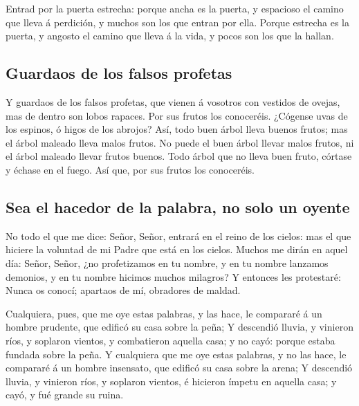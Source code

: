  Entrad por la puerta estrecha: porque ancha es la puerta,
y espacioso el camino que lleva á perdición, y muchos son los que entran
por ella.  Porque estrecha es la puerta, y angosto el
camino que lleva á la vida, y pocos son los que la hallan.

\hypertarget{guardaos-de-los-falsos-profetas}{%
\subsection{Guardaos de los falsos
profetas}\label{guardaos-de-los-falsos-profetas}}

 Y guardaos de los falsos profetas, que vienen á vosotros
con vestidos de ovejas, mas de dentro son lobos rapaces. 
Por sus frutos los conoceréis. ¿Cógense uvas de los espinos, ó higos de
los abrojos?  Así, todo buen árbol lleva buenos frutos; mas
el árbol maleado lleva malos frutos.  No puede el buen
árbol llevar malos frutos, ni el árbol maleado llevar frutos buenos.
 Todo árbol que no lleva buen fruto, córtase y échase en el
fuego.  Así que, por sus frutos los conoceréis.

\hypertarget{sea-el-hacedor-de-la-palabra-no-solo-un-oyente}{%
\subsection{Sea el hacedor de la palabra, no solo un
oyente}\label{sea-el-hacedor-de-la-palabra-no-solo-un-oyente}}

 No todo el que me dice: Señor, Señor, entrará en el reino
de los cielos: mas el que hiciere la voluntad de mi Padre que está en
los cielos.  Muchos me dirán en aquel día: Señor, Señor,
¿no profetizamos en tu nombre, y en tu nombre lanzamos demonios, y en tu
nombre hicimos muchos milagros?  Y entonces les protestaré:
Nunca os conocí; apartaos de mí, obradores de maldad.

 Cualquiera, pues, que me oye estas palabras, y las hace,
le compararé á un hombre prudente, que edificó su casa sobre la peña;
 Y descendió lluvia, y vinieron ríos, y soplaron vientos, y
combatieron aquella casa; y no cayó: porque estaba fundada sobre la
peña.  Y cualquiera que me oye estas palabras, y no las
hace, le compararé á un hombre insensato, que edificó su casa sobre la
arena;  Y descendió lluvia, y vinieron ríos, y soplaron
vientos, é hicieron ímpetu en aquella casa; y cayó, y fué grande su
ruina.

